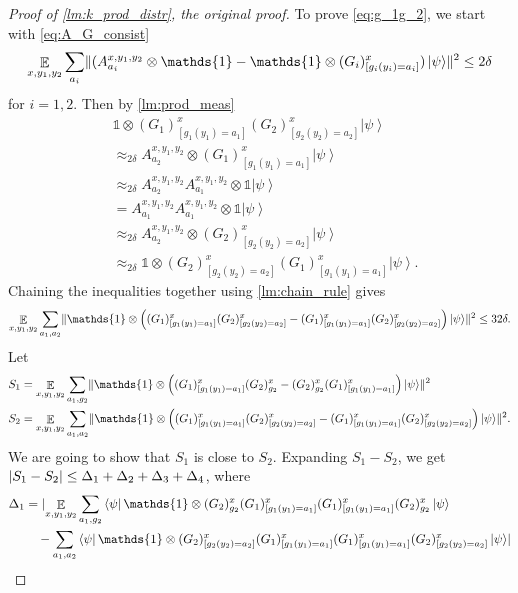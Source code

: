 \documentclass[10pt,a4paper]{article}
\theoremstyle{plain}
\theoremstyle{definition}
\DeclarePairedDelimiter{\norm}{\lVert}{\rVert}
\DeclarePairedDelimiter{\abs}{\lvert}{\rvert}
\newcommand {\bra} [1] {\ensuremath{ \left\langle #1 \right| }}
\newcommand {\ket} [1] {\ensuremath{ \left| #1 \right\rangle }}
\DeclareMathOperator*{\bigE}{\mathbb{E}}
\newcommand {\id} {\ensuremath{\mathds{1}}}
\newcommand{\x}{\otimes}
\newcommand{\appd}[1]{\approx_{#1}}
\newcommand{\1}{\mathbb{1}} %
\begin{document}
\begin{proof}[Proof of \cref{lm:k_prod_distr}, the original proof]
	To prove \cref{eq:g_1g_2}, we start with \cref{eq:A_G_consist}
	\begin{align*}
		\bigE_{x,y_1,y_2} \sum_{a_i} \norm{ (A^{x,y_1,y_2}_{a_i} \x\id - \id\x (G_i)^x_{[g_i(y_i)=a_i]})\ket{\psi}}^2 \leq 2\delta
	\end{align*}
	for $i= 1,2$.
	Then by \cref{lm:prod_meas}
	\begin{align*}
		&\id \x (G_1)^x_{[g_1(y_1)=a_1]} (G_2)^x_{[g_2(y_2)=a_2]}  \ket{\psi} \\
		&\appd{2\delta} A^{x,y_1,y_2}_{a_2} \x  (G_1)^x_{[g_1(y_1)=a_1]}  \ket{\psi} \\
		&\appd{2\delta}  A^{x,y_1,y_2}_{a_2} A^{x,y_1,y_2}_{a_1} \x \id \ket{\psi} \\
		&= A^{x,y_1,y_2}_{a_1} A^{x,y_1,y_2}_{a_1} \x \id \ket{\psi} \\
		&\appd{2\delta}  A^{x,y_1,y_2}_{a_2} \x (G_2)^x_{[g_2(y_2)=a_2]} \ket{\psi} \\
		&\appd{2\delta} \id \x  (G_2)^x_{[g_2(y_2)=a_2]} (G_1)^x_{[g_1(y_1)=a_1]} \ket{\psi}.
	\end{align*}
	Chaining the inequalities together using \cref{lm:chain_rule} gives
	\begin{align*}
		\bigE_{x,y_1,y_2} \sum_{a_1,a_2} \norm{ \id \x  \left( (G_1)^x_{[g_1(y_1)=a_1]} (G_2)^x_{[g_2(y_2)=a_2]} - (G_1)^x_{[g_1(y_1)=a_1]} (G_2)^x_{[g_2(y_2)=a_2]} \right)  \ket{\psi}}^2 \leq 32 \delta.
	\end{align*}
	Let 
	\begin{align*}
	S_1 &= \bigE_{x,y_1,y_2} \sum_{a_1, g_2} \norm{ \id \x \left((G_1)^x_{[g_1(y_1) = a_1]}(G_2)^x_{g_2} - (G_2)^x_{g_2}(G_1)^x_{[g_1(y_1) = a_1]}\right) \ket{\psi}}^2 \\
	S_2 &= \bigE_{x,y_1,y_2} \sum_{a_1,a_2} \norm{ \id \x \left( (G_1)^x_{[g_1(y_1)=a_1]} (G_2)^x_{[g_2(y_2)=a_2]} - (G_1)^x_{[g_1(y_1)=a_1]} (G_2)^x_{[g_2(y_2)=a_2]} \right)  \ket{\psi}}^2.
	\end{align*}
	We are going to show that $S_1$ is close to $S_2$. 
	Expanding $S_1 - S_2$, we get $\abs{ S_1 - S_2 } \leq \Delta_1 + \Delta_2 + \Delta_3 + \Delta_4$,
	where
	\begin{align*}
		\Delta_1 &=\abs{ \bigE_{x,y_1,y_2} \sum_{a_1, g_2}
		\bra{\psi} \id \x  (G_2)^x_{g_2} (G_1)^x_{[g_1(y_1) = a_1]} (G_1)^x_{[g_1(y_1) = a_1]} (G_2)^x_{g_2}  \ket{\psi} \\ 
		&\quad -
		 \sum_{a_1, a_2} \bra{\psi}  \id \x (G_2)^x_{[g_2(y_2) = a_2]} 
		(G_1)^x_{[g_1(y_1) = a_1]} (G_1)^x_{[g_1(y_1) = a_1]} (G_2)^x_{[g_2(y_2) = a_2]}  \ket{\psi}} \\

\end{align*}
\end{proof}
\end{document}
